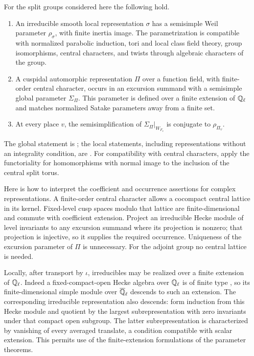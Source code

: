 \begin{theorem}\label{thm:parameters}
For the split groups considered here the following hold.
\begin{enumerate}[label=\textup{(\roman*)}]
\item An irreducible smooth local representation $\sigma$ has a
semisimple Weil parameter $\rho_\sigma$, with finite inertia image.
The parametrization is compatible with normalized parabolic induction,
tori and local class field theory, group isomorphisms, central characters,
and twists through algebraic characters of the group.
\item A cuspidal automorphic representation $\Pi$ over a function field,
with finite-order central character, occurs in an excursion summand
with a semisimple global parameter $\Sigma_\Pi$. This parameter is
defined over a finite extension of $\mathbb Q_\ell$ and matches normalized
Satake parameters away from a finite set.
\item At every place $v$, the semisimplification of
$\Sigma_\Pi|_{W_{F_v}}$ is conjugate to $\rho_{\Pi_v}$.
\end{enumerate}
\end{theorem}

The global statement is \cite[Th\'eor\`eme~0.1]{VLafforgue}; the local
statements, including representations without an integrality condition,
are \cite[Th\'eor\`eme~0.1 and Remarque~0.2]{GenestierLafforgue}.
For compatibility with central characters, apply the functoriality for
homomorphisms with normal image to the inclusion of the central split
torus.

Here is how to interpret the coefficient and occurrence assertions for
complex representations. A finite-order central character allows a
cocompact central lattice in its kernel. Fixed-level cusp spaces modulo
that lattice are finite-dimensional and commute with coefficient
extension. Project an irreducible Hecke module of level invariants to
any excursion summand where its projection is nonzero; that projection
is injective, so it supplies the required occurrence. Uniqueness of the
excursion parameter of $\Pi$ is unnecessary. For the adjoint group no
central lattice is needed.

Locally, after transport by $\iota$, irreducibles may be realized over a
finite extension of $\mathbb Q_\ell$. Indeed a fixed-compact-open Hecke algebra
over $\mathbb Q_\ell$ is of finite type
\cite[Theorem~1.1]{DHKMFiniteness2024}, so its finite-dimensional simple
module over $\overline{\mathbb Q}_\ell$ descends to
such an extension. The corresponding irreducible representation also
descends: form induction from this Hecke module and quotient by the
largest subrepresentation with zero invariants under that compact
open subgroup. The latter subrepresentation is characterized by
vanishing of every averaged translate, a condition compatible with
scalar extension. This permits use of the finite-extension formulations
of the parameter theorems.

